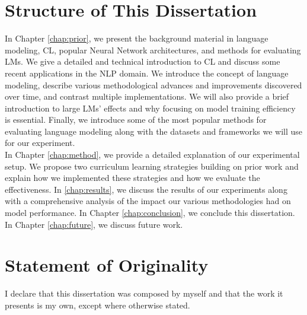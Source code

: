 \section{Structure of This Dissertation}
\label{chap:intro:sec:structure}
In Chapter \ref{chap:prior}, we present the background material in language modeling, 
CL, popular Neural Network architectures, and methods for evaluating LMs. We give a detailed and technical introduction to CL and discuss some recent applications in the NLP domain. We introduce the concept of language modeling, describe various methodological advances and improvements discovered over time, and contrast multiple implementations. We will also provide a brief introduction to large LMs' effects and why focusing on model training efficiency is essential. Finally, we introduce some of the most popular methods for evaluating language modeling along with the datasets and frameworks we will use for our experiment. \\
In Chapter \ref{chap:method}, we provide a detailed explanation of our experimental setup. We propose two curriculum learning strategies building on prior work and explain how we implemented these strategies and how we evaluate the effectiveness. 
In \ref{chap:results}, we discuss the results of our experiments along with a comprehensive analysis of the impact our various methodologies had on model performance.
In Chapter \ref{chap:conclusion}, we conclude this dissertation.
In Chapter \ref{chap:future}, we discuss future work.
\section{Statement of Originality}
\label{chap:intro:sec:statement}
I declare that this dissertation was composed by myself and that the work it presents is my own, except where otherwise stated.